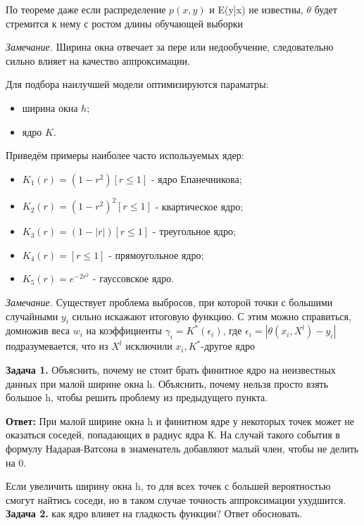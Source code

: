 По теореме даже если распределение $p(x,y)$ и E(y|x) не известны, $\theta$ будет стремится к нему с ростом длины обучающей выборки


\textit{Замечание.} Ширина окна отвечает за пере или недообучение,
следовательно сильно влияет на качество аппроксимации.



Для подбора наилучшей модели оптимизируются параматры:
\begin{itemize}
    \item ширина окна $h$;
    \item ядро $K$.
\end{itemize}

 Приведём примеры наиболее часто используемых ядер:
\begin{itemize}
    \item $\displaystyle K_1(r) = (1-r^2)[r\le1]$ - ядро Епанечникова;
    \item $\displaystyle K_2(r) = (1-r^2)^2[r\le1]$ - квартическое ядро;
    \item $\displaystyle K_3(r) = (1-|r|)[r\le1]$ - треугольное ядро;
    \item $\displaystyle K_4(r) = [r\le1]$ - прямоугольное ядро; \item $\displaystyle K_5(r) = e^{-2r^2}$ - гауссовское ядро.
\end{itemize}
\textit{Замечание.} Существует проблема выбросов, при которой точки с большими случайными $y_i$ сильно искажают итоговую функцию. С этим можно справиться, домножив веса $w_i$ на коэффициенты $\gamma_i = K^*(\epsilon_i)$, где $\epsilon_i =|\theta(x_i, X^l)-y_i|$ подразумевается, что из $X^l$ исключили $x_i, K^*$-другое ядро


\textbf{Задача 1.}
Объяснить, почему не стоит брать финитное ядро на неизвестных данных при малой ширине окна h. Объяснить, почему нельзя просто взять большое h, чтобы решить проблему из предыдущего пункта.

\textbf{Ответ:}
При малой ширине окна h и финитном ядре у некоторых точек может не оказаться соседей, попадающих в радиус ядра К. На случай такого события в формулу Надарая-Ватсона в знаменатель добавляют малый член, чтобы не делить на 0.

Если увеличить ширину окна h, то для всех точек с большей вероятностью смогут найтись соседи, но в таком случае точность аппроксимации ухудшится.
\\

\textbf{Задача 2.}  как ядро влияет на гладкость функции? Ответ обосновать.

